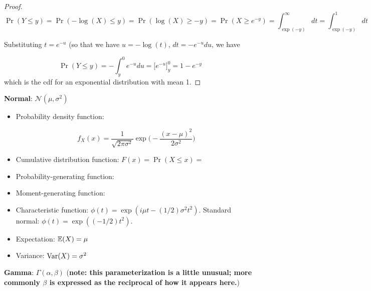 \begin{proof}
\[
\Pr(Y \leq y) = \Pr(- \log(X) \leq y) = \Pr( \log(X) \geq -y)  = \Pr(X \geq e^{-y}) = \int_{\exp(-y)}^\infty dt = \int_{\exp(-y)}^1 dt
\]

Substituting \(t = e^{-u}\) (so that we have \(u = -\log(t)\), \(dt = -e^{-u} du\), we have

\[
\Pr(Y \leq y) =  -\int_{y}^{0}  e^{-u} du = \big[e^{-u} \big]_y^0 = 1 - e^{- y}
\]
which is the cdf for an exponential distribution with mean 1.
\end{proof}

\textbf{Normal}: \(\mathcal{N}(\mu, \sigma^2)\)

\begin{itemize}

\item Probability density function:

\[
f_X(x) = \frac{1}{\sqrt{2 \pi \sigma^2}} \exp \bigg( - \frac{(x-\mu)^2}{2 \sigma^2}\bigg)
\]

\item Cumulative distribution function: \(F(x) = \Pr(X \leq x) = \)

\item Probability-generating function:

\item Moment-generating function:

\item Characteristic function: \(\phi(t) = \exp(i\mu t - (1/2) \sigma^2t^2)\). Standard normal: \(\phi(t) = \exp((-1/2)t^2)\).

\item Expectation: \(\E(X) = \mu\)

\item Variance: \(\Var(X) = \sigma^2 \)

\end{itemize}

\textbf{Gamma}: \(\Gamma(\alpha, \beta)\) (\textbf{note: this parameterization is a little unusual; more commonly \(\beta\) is expressed as the reciprocal of how it appears here.})

